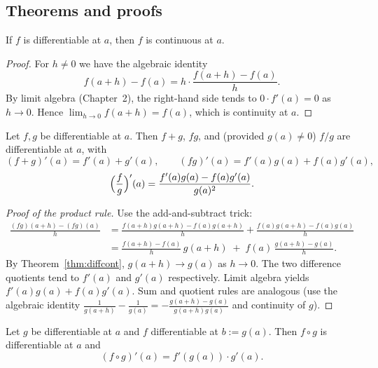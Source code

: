 \subsection*{Theorems and proofs}

\begin{theorem}\label{thm:diffcont}
If $f$ is differentiable at $a$, then $f$ is continuous at $a$.
\end{theorem}

\begin{proof}
For $h\ne 0$ we have the algebraic identity
\[
f(a+h)-f(a)=h\cdot\frac{f(a+h)-f(a)}{h}.
\]
By limit algebra (Chapter~2), the right-hand side tends to $0\cdot f'(a)=0$ as $h\to 0$. Hence $\lim_{h\to 0}f(a+h)=f(a)$, which is continuity at $a$.
\end{proof}

\begin{theorem}\label{thm:rules}
Let $f,g$ be differentiable at $a$. Then $f+g$, $fg$, and (provided $g(a)\ne 0$) $f/g$ are differentiable at $a$, with
\[
(f+g)'(a)=f'(a)+g'(a),\qquad (fg)'(a)=f'(a)g(a)+f(a)g'(a),
\]
\[
\Bigl(\frac{f}{g}\Bigr)'(a)=\frac{f'(a)g(a)-f(a)g'(a)}{g(a)^2}.
\]
\end{theorem}

\begin{proof}[Proof of the product rule]
Use the add-and-subtract trick:
\begin{align*}
\frac{(fg)(a+h)-(fg)(a)}{h}
&=\frac{f(a+h)g(a+h)-f(a)g(a+h)}{h}+\frac{f(a)g(a+h)-f(a)g(a)}{h}\\
&=\frac{f(a+h)-f(a)}{h}\,g(a+h)\;+\;f(a)\,\frac{g(a+h)-g(a)}{h}.
\end{align*}
By Theorem~\ref{thm:diffcont}, $g(a+h)\to g(a)$ as $h\to 0$. The two difference quotients tend to $f'(a)$ and $g'(a)$ respectively. Limit algebra yields $f'(a)g(a)+f(a)g'(a)$. Sum and quotient rules are analogous (use the algebraic identity $\tfrac{1}{g(a+h)}-\tfrac{1}{g(a)}=-\tfrac{g(a+h)-g(a)}{g(a+h)g(a)}$ and continuity of $g$).
\end{proof}

\begin{theorem}\label{thm:chain}
Let $g$ be differentiable at $a$ and $f$ differentiable at $b:=g(a)$. Then $f\circ g$ is differentiable at $a$ and
\[
(f\circ g)'(a)=f'(g(a))\cdot g'(a).
\]
\end{theorem}

